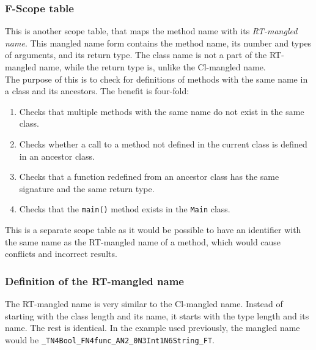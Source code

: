 \documentclass{article}
\begin{document}
\subsubsection*{F-Scope table}
This is another scope table, that maps the method name with its \textit{RT-mangled name}. This mangled name form contains the method name, its number and types of arguments, and its return type. The class name is not a part of the RT-mangled name, while the return type is, unlike the Cl-mangled name.
\\
The purpose of this is to check for definitions of methods with the same name in a class and its ancestors. The benefit is four-fold:
\begin{enumerate}
	\item Checks that multiple methods with the same name do not exist in the same class.
	\item Checks whether a call to a method not defined in the current class is defined in an ancestor class.
	\item Checks that a function redefined from an ancestor class has the same signature and the same return type.
	\item Checks that the \verb|main()| method exists in the \verb|Main| class.
\end{enumerate}
This is a separate scope table as it would be possible to have an identifier with the same name as the RT-mangled name of a method, which would cause conflicts and incorrect results.

\subsubsection*{Definition of the RT-mangled name}
The RT-mangled name is very similar to the Cl-mangled name. Instead of starting with the class length and its name, it starts with the type length and its name. The rest is identical. In the example used previously, the mangled name would be \verb|_TN4Bool_FN4func_AN2_0N3Int1N6String_FT|.
\end{document}

